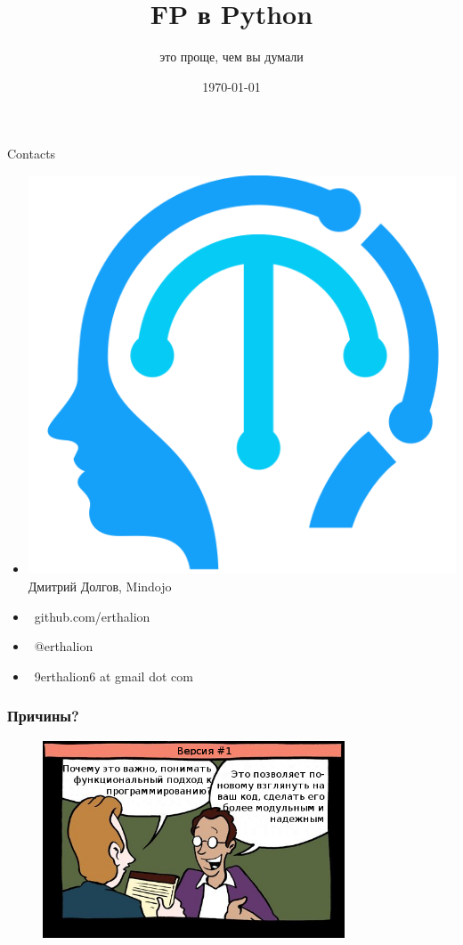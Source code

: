 \documentclass[14pt, compress, aspectratio=169]{beamer}
\title{FP в Python}
\subtitle{это проще, чем вы думали}
\date{\today}
\institute{}
\def\twitter{{\FA \faTwitter}}
\def\github{{\FA \faGithubSign}}
\def\email{{\FA \faEnvelope}}
\begin{document}
\fontsize{19pt}{20}\selectfont
\maketitle

\section{}

\begin{frame}{Contacts}
    \begin{itemize}[label={}]
        \item \includegraphics[scale=0.04]{mindojo_logo.png} Дмитрий Долгов, Mindojo
        \item {\github\ github.com/erthalion}
        \item {\twitter\ @erthalion}
        \item \email\ 9erthalion6 at gmail dot com
    \end{itemize}
\end{frame}

\begin{frame}
    \frametitle{Причины?}
    \vspace{-35pt}
    \begin{figure}
        \includegraphics[width=0.8\textwidth,center]{first_option.png}
    \end{figure}
\end{frame}
\end{document}

